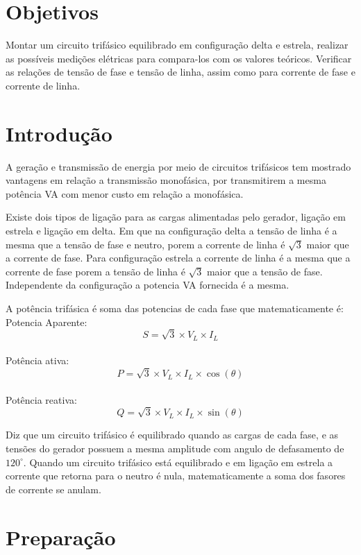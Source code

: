 \documentclass[a4paper, 12pt]{article}
\begin{document}
\thispagestyle{empty}

\newpage
\section{Objetivos}

\justifying
    Montar um circuito trifásico equilibrado em configuração delta e estrela, realizar as possíveis medições elétricas para compara-los com os valores teóricos. Verificar as relações de tensão de fase e tensão de linha, assim como para corrente de fase e corrente de linha.
\section{Introdução} 

\justifying
   A geração e transmissão de energia por meio de circuitos trifásicos tem mostrado vantagens em relação a transmissão monofásica, por transmitirem a mesma potência VA com menor custo em relação a monofásica.
   
   Existe dois tipos de ligação para as cargas alimentadas pelo gerador, ligação em estrela e ligação em delta. Em que na configuração delta a tensão  de linha é a mesma que a tensão de fase e neutro, porem a corrente de linha é  \(\sqrt{3}\)  maior que a corrente de fase. Para configuração estrela a corrente de linha é a mesma que a corrente de fase porem a tensão de linha é  \(\sqrt{3}\) maior que a tensão de fase. Independente da configuração a potencia VA fornecida é a mesma.
   
   A potência trifásica é soma das potencias de cada fase que matematicamente é:\\ Potencia Aparente: 
    \[ S = \sqrt{3} \times V_L \times I_L \]
    \\Potência ativa:
    \[ P = \sqrt{3} \times V_L \times I_L \times \cos(\theta) \]
    \\Potência reativa:
    \[ Q = \sqrt{3} \times V_L \times I_L \times \sin(\theta) \]
    
    Diz que um circuito trifásico é equilibrado quando as cargas de cada fase, e as tensões do gerador possuem a mesma amplitude com angulo de defasamento de \(120^\circ\). Quando um circuito trifásico está equilibrado e em ligação em estrela a corrente que retorna para o neutro é nula, matematicamente a soma dos fasores de corrente se anulam.


\newpage
\section{Preparação}
\end{document}
